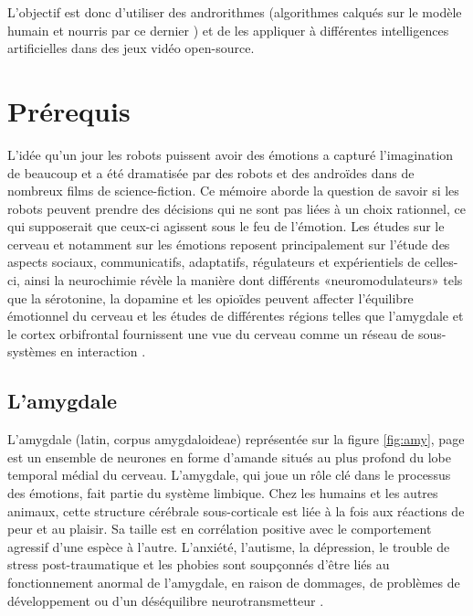 L'objectif est donc d'utiliser des androrithmes (algorithmes calqués sur le modèle humain et nourris par ce dernier \parencite{humanityvstechnology}) et de les appliquer à différentes intelligences artificielles dans des jeux vidéo open-source. 



\section{Prérequis}

L'idée qu'un jour les robots puissent avoir des émotions a capturé l'imagination de beaucoup et a été dramatisée par des robots et des androïdes dans de nombreux films de science-fiction. Ce mémoire aborde la question de savoir si les robots peuvent prendre des décisions qui ne sont pas liées à un choix rationnel, ce qui supposerait que ceux-ci agissent sous le feu de l’émotion. Les études sur le cerveau et notamment sur  les émotions reposent principalement sur l’étude des aspects sociaux, communicatifs, adaptatifs, régulateurs et expérientiels de celles-ci, ainsi la neurochimie révèle la manière dont différents «neuromodulateurs» tels que la sérotonine, la dopamine et les opioïdes peuvent affecter l’équilibre émotionnel du cerveau et les études de différentes régions telles que l'amygdale et le cortex orbifrontal fournissent une vue du cerveau comme un réseau de sous-systèmes en interaction \parencite{whoneedsemotions}.



\subsection{ L'amygdale}

L'amygdale (latin, corpus amygdaloideae) représentée sur la figure \ref{fig:amy}, page \pageref{fig:amy}
est un ensemble de neurones en forme d'amande situés au plus profond du lobe temporal médial du cerveau.
L'amygdale, qui joue un rôle clé dans le processus des émotions, fait partie du système limbique.
Chez les humains et les autres animaux, cette structure cérébrale sous-corticale est liée à la fois aux réactions de peur et au plaisir.
Sa taille est en corrélation positive avec le comportement agressif d'une espèce à l'autre.
L'anxiété, l'autisme, la dépression, le trouble de stress post-traumatique et les phobies sont soupçonnés d'être liés au fonctionnement anormal de l'amygdale, en raison de dommages, de problèmes de développement ou d'un déséquilibre neurotransmetteur \parencite{amygdale}.

